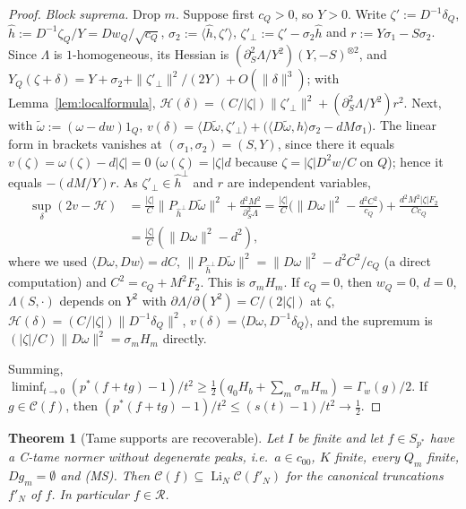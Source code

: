 \documentclass[10pt]{amsart}
\newtheorem{theorem}{Theorem}[section]
\theoremstyle{definition}
\theoremstyle{remark}
\newcommand{\Cset}{\mathcal C}
\newcommand{\Li}{\operatorname*{Li}}
\newcommand{\Rec}{\mathcal R}
\newcommand{\ip}[2]{\langle #1,#2\rangle}
\begin{document}
\begin{proof}
\emph{Block suprema.}  Drop $m$.  Suppose first $c_Q>0$, so $Y>0$.  Write
$\zeta':=D^{-1}\delta_Q$, $\hat h:=D^{-1}\zeta_Q/Y=D w_Q/\sqrt{c_Q}$,
$\sigma_2:=\ip{\hat h}{\zeta'}$, $\zeta'_\perp:=\zeta'-\sigma_2\hat h$ and
$r:=Y\sigma_1-S\sigma_2$.  Since $\Lambda$ is $1$-homogeneous, its Hessian
is $(\partial_S^2\Lambda/Y^2)(Y,-S)^{\otimes2}$, and
$Y_Q(\zeta+\delta)=Y+\sigma_2+\|\zeta'_\perp\|^2/(2Y)+O(\|\delta\|^3)$;
with Lemma~\ref{lem:localformula},
$\mathcal H(\delta)=(C/|\zeta|)\|\zeta'_\perp\|^2+(\partial_S^2\Lambda/Y^2)
r^2$.  Next, with $\tilde\omega:=(\omega-dw)1_Q$,
$v(\delta)=\ip{D\tilde\omega}{\zeta'_\perp}+\big(\ip{D\tilde\omega}{\hat h}
\sigma_2-dM\sigma_1\big)$.  The linear form in brackets vanishes at
$(\sigma_1,\sigma_2)=(S,Y)$, since there it equals $v(\zeta)=\omega(\zeta)
-d|\zeta|=0$ ($\omega(\zeta)=|\zeta|d$ because $\zeta=|\zeta|D^2w/C$ on $Q$);
hence it equals $-(dM/Y)r$.  As $\zeta'_\perp\in\hat h^\perp$ and $r$ are
independent variables,
\begin{align*}
 \sup_\delta(2v-\mathcal H)&=\frac{|\zeta|}C\|P_{\hat h^\perp}D\tilde\omega
 \|^2+\frac{d^2M^2}{\partial_S^2\Lambda}
 =\frac{|\zeta|}C\Big(\|D\omega\|^2-\frac{d^2C^2}{c_Q}\Big)+
 \frac{d^2M^2|\zeta|F_2}{Cc_Q}\\
 &=\frac{|\zeta|}C(\|D\omega\|^2-d^2),
\end{align*}
where we used $\ip{D\omega}{Dw}=dC$, $\|P_{\hat h^\perp}D\tilde\omega\|^2=
\|D\omega\|^2-d^2C^2/c_Q$ (a direct computation) and $C^2=c_Q+M^2F_2$.  This
is $\sigma_mH_m$.  If $c_Q=0$, then $w_Q=0$, $d=0$, $\Lambda(S,\cdot)$
depends on $Y^2$ with $\partial\Lambda/\partial(Y^2)=C/(2|\zeta|)$ at
$\zeta$, $\mathcal H(\delta)=(C/|\zeta|)\|D^{-1}\delta_Q\|^2$,
$v(\delta)=\ip{D\omega}{D^{-1}\delta_Q}$, and the supremum is
$(|\zeta|/C)\|D\omega\|^2=\sigma_mH_m$ directly.

Summing, $\liminf_{t\to0}(p^*(f+tg)-1)/t^2\ge\frac12(q_0H_b+\sum_m\sigma_m
H_m)=\Gamma_w(g)/2$.  If $g\in\Cset(f)$, then $(p^*(f+tg)-1)/t^2\le
(s(t)-1)/t^2\to\frac12$.
\end{proof}

\begin{theorem}[Tame supports are recoverable]\label{thm:tame}
Let $I$ be finite and let $f\in S_{p^*}$ have a C-tame normer without
degenerate peaks, i.e.\ $a\in c_{00}$, $K$ finite, every $Q_m$ finite,
$Dg_m=\emptyset$ and \textup{(MS)}.  Then
$\Cset(f)\subseteq\Li_N\Cset(f'_N)$ for the canonical truncations
$f'_N$ of $f$.  In particular $f\in\Rec$.
\end{theorem}
\end{document}

